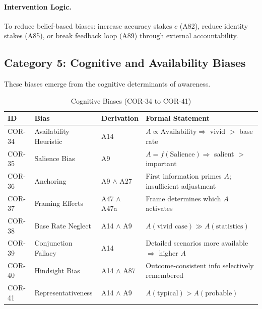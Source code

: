 \paragraph{Intervention Logic.} To reduce belief-based biases: increase accuracy stakes $c$ (A82), reduce identity stakes (A85), or break feedback loop (A89) through external accountability.


\subsection{Category 5: Cognitive and Availability Biases}

These biases emerge from the cognitive determinants of awareness.

\begin{table}[htbp]
\small
\centering
\caption{Cognitive Biases (COR-34 to COR-41)}
\label{tab:cor-cognitive}
\begin{tabular}{p{1.2cm}p{2.8cm}p{3.8cm}p{5cm}}
\toprule
\textbf{ID} & \textbf{Bias} & \textbf{Derivation} & \textbf{Formal Statement} \\
\midrule
COR-34 & Availability Heuristic & A14 & $A \propto \text{Availability} \Rightarrow$ vivid $>$ base rate \\
COR-35 & Salience Bias & A9 & $A = f(\text{Salience}) \Rightarrow$ salient $>$ important \\
COR-36 & Anchoring & A9 $\land$ A27 & First information primes $A$; insufficient adjustment \\
COR-37 & Framing Effects & A47 $\land$ A47a & Frame determines which $A$ activates \\
COR-38 & Base Rate Neglect & A14 $\land$ A9 & $A(\text{vivid case}) \gg A(\text{statistics})$ \\
COR-39 & Conjunction Fallacy & A14 & Detailed scenarios more available $\Rightarrow$ higher $A$ \\
COR-40 & Hindsight Bias & A14 $\land$ A87 & Outcome-consistent info selectively remembered \\
COR-41 & Representativeness & A14 $\land$ A9 & $A(\text{typical}) > A(\text{probable})$ \\
\bottomrule
\end{tabular}
\end{table}

